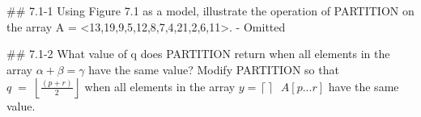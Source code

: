 
## 7.1-1 Using Figure 7.1 as a model, illustrate the operation of PARTITION on the array A = <13,19,9,5,12,8,7,4,21,2,6,11>.
- Omitted

## 7.1-2  What value of q does PARTITION return when all elements in the array \(\alpha+\beta=\gamma\) have the same value? Modify PARTITION so that $q\; =\; \left\lfloor \frac{\left( p+r \right)}{2} \right\rfloor$ when all elements in the array $y=\left\lceil  \right\rceil\; \; A\left[ p...r \right]$ have the same value.